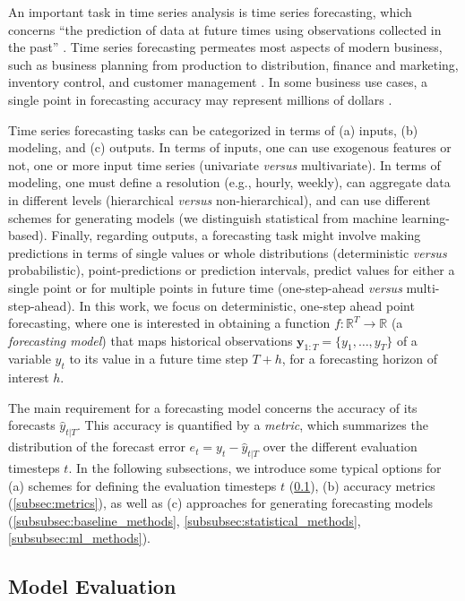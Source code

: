 An important task in time series analysis is time series forecasting, which concerns ``the prediction of data at future times using observations collected in the past'' \cite{hyndman2018principles}. Time series forecasting permeates most aspects of modern business, such as business planning from production to distribution,  finance and marketing, inventory control, and customer management \cite{oreshkin2019nbeats}. In some business use cases, a single point in forecasting accuracy may represent millions of dollars \cite{kahn2003measure, jain2012answers}.

Time series forecasting tasks can be categorized in terms of (a) inputs, (b) modeling, and (c) outputs. In terms of inputs, one can use exogenous features or not, one or more input time series (univariate \textit{versus} multivariate). In terms of modeling, one must define a resolution (e.g., hourly, weekly), can aggregate data in different levels (hierarchical \textit{versus} non-hierarchical), and can use different schemes for generating models (we distinguish statistical from machine learning-based). Finally, regarding outputs, a forecasting task might involve making predictions in terms of single values or whole distributions (deterministic \textit{versus} probabilistic), point-predictions or prediction intervals, predict values for either a single point or for multiple points in future time (one-step-ahead \textit{versus} multi-step-ahead). In this work, we focus on deterministic, one-step ahead point forecasting, where one is interested in obtaining a function $f: \mathbb{R}^T \rightarrow \mathbb{R}$ (a \textit{forecasting model}) that maps historical observations  $\boldsymbol{y} _{1:T} = \{y_1,…,y_T\}$ of a variable $y_t$ to its value in a future time step $T+h$, for a forecasting horizon of interest $h$.

The main requirement for a forecasting model concerns the accuracy of its forecasts $\hat{y}_{t|T}$. This accuracy is quantified by a \textit{metric}, which summarizes the distribution of the forecast error $e_{t} = y_{t} - \hat{y}_{t|T}$ over the different evaluation timesteps $t$. In the following subsections, we introduce some typical options for (a) schemes for defining the evaluation timesteps $t$ (\ref{subsec:model_evaluation}), (b) accuracy metrics (\ref{subsec:metrics}), as well as (c) approaches for generating  forecasting models (\ref{subsubsec:baseline_methods}, \ref{subsubsec:statistical_methods}, \ref{subsubsec:ml_methods}).

\subsection{Model Evaluation}\label{subsec:model_evaluation}

